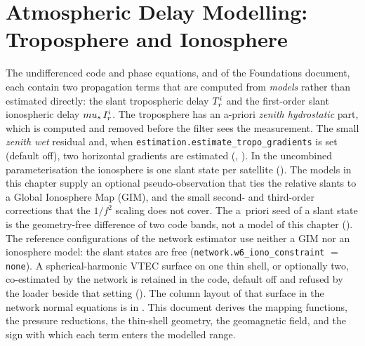 \documentclass[main.tex]{subfiles}
\begin{document}
\section{Atmospheric Delay Modelling: Troposphere and Ionosphere}\label{sec:atmos}

The undifferenced code and phase equations,
 and
 of the Foundations document,
each contain two propagation terms that are computed from \emph{models}
rather than estimated directly: the slant tropospheric delay
$T^i_r$ and the first-order slant ionospheric delay
$mu_s\, I^i_r$.  The troposphere has an a-priori \emph{zenith
hydrostatic} part, which is computed and removed before the filter sees
the measurement.  The small \emph{zenith wet} residual and, when
\texttt{estimation.estimate\_tropo\_gradients} is set (default off), two
horizontal gradients are estimated (, ).  In the uncombined
parameterisation the ionosphere is one slant state per satellite
().  The models in this
chapter supply an optional pseudo-observation that
ties the relative slants to a Global Ionosphere Map (GIM), and the small
second- and third-order corrections that the $1/f^2$ scaling does not
cover.  The a~priori seed of a slant state is the geometry-free
difference of two code bands, not a model of this chapter
().  The
reference configurations of the network estimator use neither a GIM nor
an ionosphere model: the slant states are free
(\texttt{network.w6\_iono\_constraint} $=$ \texttt{none}).  A
spherical-harmonic VTEC surface on one thin shell, or optionally two,
co-estimated by the network is retained in the code, default off and
refused by the loader beside that setting ().  The
column layout of that surface in the network normal equations is in
.  This document derives the
mapping functions, the pressure reductions, the thin-shell geometry, the
geomagnetic field, and the sign with which each term enters the modelled
range.
\end{document}
